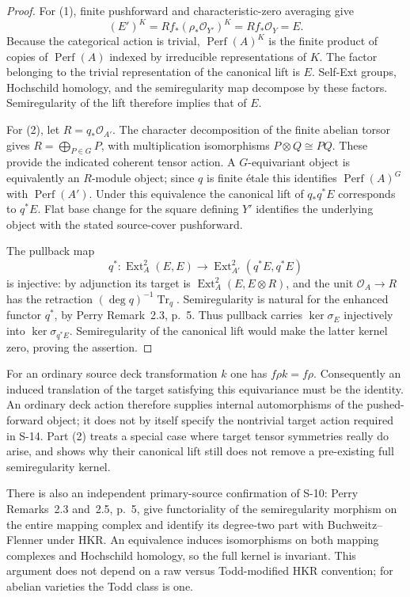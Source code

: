 \documentclass[11pt,a4paper]{article}
\theoremstyle{definition}
\begin{document}
\begin{proof}
For (1), finite pushforward and characteristic-zero averaging give
\[
 (E')^K
 =Rf_*(\rho_*\mathcal O_{Y'})^K
 =Rf_*\mathcal O_Y=E.
\]
Because the categorical action is trivial,
$\operatorname{Perf}(A)^K$ is the finite product of copies of
$\operatorname{Perf}(A)$ indexed by irreducible representations
of $K$. The factor belonging to the trivial representation of
the canonical lift is $E$. Self-Ext groups, Hochschild homology,
and the semiregularity map decompose by these factors.
Semiregularity of the lift therefore implies that of $E$.

For (2), let $R=q_*\mathcal O_{A'}$. The character decomposition
of the finite abelian torsor gives
$R=\bigoplus_{P\in G}P$, with multiplication isomorphisms
$P\otimes Q\cong PQ$. These provide the indicated coherent
tensor action. A $G$-equivariant object is equivalently an
$R$-module object; since $q$ is finite \'etale this identifies
$\operatorname{Perf}(A)^G$ with $\operatorname{Perf}(A')$.
Under this equivalence the canonical lift of $q_*q^*E$
corresponds to $q^*E$.
Flat base change for the square defining $Y'$ identifies the
underlying object with the stated source-cover pushforward.

The pullback map
\[
 q^*:\operatorname{Ext}^2_A(E,E)
 \longrightarrow
 \operatorname{Ext}^2_{A'}(q^*E,q^*E)
\]
is injective: by adjunction its target is
$\operatorname{Ext}^2_A(E,E\otimes R)$, and the unit
$\mathcal O_A\to R$ has the retraction
$(\deg q)^{-1}\operatorname{Tr}_q$.
Semiregularity is natural for the enhanced functor $q^*$,
by Perry Remark~2.3, p.~5. Thus pullback carries
$\ker\sigma_E$ injectively into $\ker\sigma_{q^*E}$.
Semiregularity of the canonical lift would make the latter
kernel zero, proving the assertion.
\end{proof}

For an ordinary source deck transformation $k$ one has
$f\rho k=f\rho$. Consequently an induced translation of the
target satisfying this equivariance must be the identity.
An ordinary deck action therefore supplies internal
automorphisms of the pushed-forward object; it does not by
itself specify the nontrivial target action required in S-14.
Part (2) treats a special case where target tensor symmetries
really do arise, and shows why their canonical lift still
does not remove a pre-existing full semiregularity kernel.

There is also an independent primary-source confirmation of S-10:
Perry Remarks~2.3 and~2.5, p.~5, give functoriality of the
semiregularity morphism on the entire mapping complex and identify
its degree-two part with Buchweitz--Flenner under HKR.
An equivalence induces isomorphisms on both mapping complexes and
Hochschild homology, so the full kernel is invariant. This argument
does not depend on a raw versus Todd-modified HKR convention;
for abelian varieties the Todd class is one.
\end{document}
